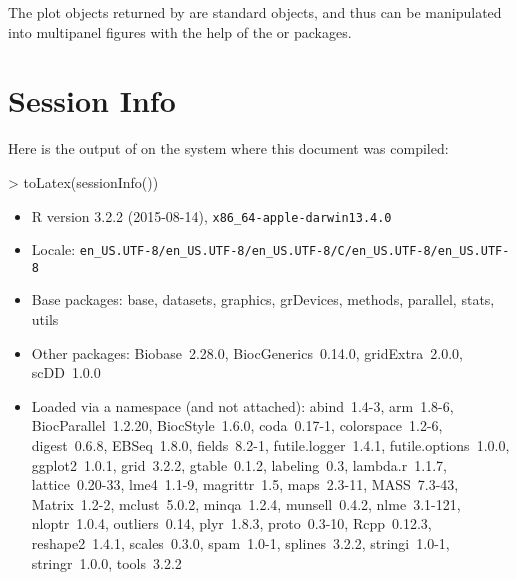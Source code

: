 \documentclass{article}
\begin{document}
The plot objects returned by  are standard  objects, and thus can be manipulated into multipanel figures with the help of the  or  packages.



  
\section{Session Info}
Here is the output of  on the system where this document was compiled:

\begin{Schunk}
\begin{Sinput}
> toLatex(sessionInfo())
\end{Sinput}
\begin{itemize}\raggedright
  \item R version 3.2.2 (2015-08-14), \verb|x86_64-apple-darwin13.4.0|
  \item Locale: \verb|en_US.UTF-8/en_US.UTF-8/en_US.UTF-8/C/en_US.UTF-8/en_US.UTF-8|
  \item Base packages: base, datasets, graphics, grDevices, methods, parallel,
    stats, utils
  \item Other packages: Biobase~2.28.0, BiocGenerics~0.14.0, gridExtra~2.0.0,
    scDD~1.0.0
  \item Loaded via a namespace (and not attached): abind~1.4-3, arm~1.8-6,
    BiocParallel~1.2.20, BiocStyle~1.6.0, coda~0.17-1, colorspace~1.2-6,
    digest~0.6.8, EBSeq~1.8.0, fields~8.2-1, futile.logger~1.4.1,
    futile.options~1.0.0, ggplot2~1.0.1, grid~3.2.2, gtable~0.1.2, labeling~0.3,
    lambda.r~1.1.7, lattice~0.20-33, lme4~1.1-9, magrittr~1.5, maps~2.3-11,
    MASS~7.3-43, Matrix~1.2-2, mclust~5.0.2, minqa~1.2.4, munsell~0.4.2,
    nlme~3.1-121, nloptr~1.0.4, outliers~0.14, plyr~1.8.3, proto~0.3-10,
    Rcpp~0.12.3, reshape2~1.4.1, scales~0.3.0, spam~1.0-1, splines~3.2.2,
    stringi~1.0-1, stringr~1.0.0, tools~3.2.2
\end{itemize}\end{Schunk}


\end{document}
